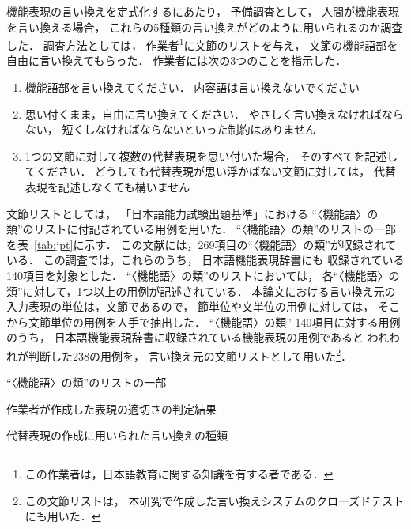 \documentclass[japanese]{jnlp_1.4}
\begin{document}
機能表現の言い換えを定式化するにあたり，
予備調査として，
人間が機能表現を言い換える場合，
これらの5種類の言い換えがどのように用いられるのか調査した．
調査方法としては，
作業者\footnote{
	この作業者は，日本語教育に関する知識を有する者である．
}に文節のリストを与え，
文節の機能語部を自由に言い換えてもらった．
作業者には次の3つのことを指示した．
\begin{enumerate}
\item 機能語部を言い換えてください．
      内容語は言い換えないでください
\item 思い付くまま，自由に言い換えてください．
      やさしく言い換えなければならない，
      短くしなければならないといった制約はありません
\item 1つの文節に対して複数の代替表現を思い付いた場合，
      そのすべてを記述してください．
      どうしても代替表現が思い浮かばない文節に対しては，
      代替表現を記述しなくても構いません
\end{enumerate}

文節リストとしては，
「日本語能力試験出題基準」における
``〈機能語〉の類''のリストに付記されている用例を用いた．
``〈機能語〉の類''のリストの一部を表~\ref{tab:jpt}に示す．
この文献には，269項目の``〈機能語〉の類''が収録されている．
この調査では，これらのうち，
日本語機能表現辞書にも
収録されている140項目を対象とした．
``〈機能語〉の類''のリストにおいては，
各``〈機能語〉の類''に対して，1つ以上の用例が記述されている．
本論文における言い換え元の入力表現の単位は，文節であるので，
節単位や文単位の用例に対しては，
そこから文節単位の用例を人手で抽出した．
``〈機能語〉の類'' 140項目に対する用例のうち，
日本語機能表現辞書に収録されている機能表現の用例であると
われわれが判断した238の用例を，
言い換え元の文節リストとして用いた\footnote{
	この文節リストは，
	本研究で作成した言い換えシステムのクローズドテストにも用いた．
}．

\begin{table}[t]
\caption{``〈機能語〉の類''のリストの一部}
\label{tab:jpt}

\end{table}
\begin{table}[t]
\begin{minipage}{0.5\textwidth}
\begin{center}
\caption{作業者が作成した表現の適切さの判定結果}
\label{judge}

\end{center}
\end{minipage}
\begin{minipage}{0.5\textwidth}
\begin{center}
\caption{代替表現の作成に用いられた言い換えの種類}
\label{tab:native}

\end{center}
\end{minipage}
\end{table}
\end{document}
